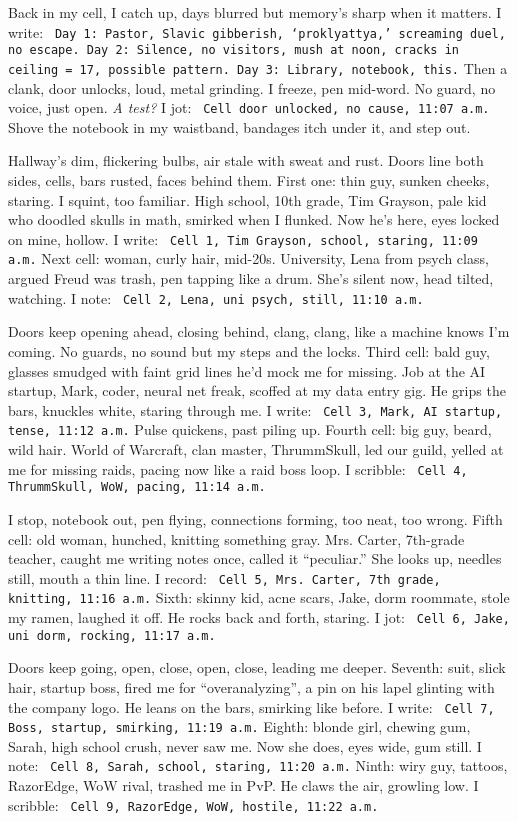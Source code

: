 \documentclass[12pt]{article} %
\newcommand{\note}[1]{\texttt{\small \color{DarkGray} #1}}
\begin{document}
Back in my cell, I catch up, days blurred but memory’s sharp when it matters. I write: \note{Day 1: Pastor, Slavic gibberish, ‘proklyattya,’ screaming duel, no escape. Day 2: Silence, no visitors, mush at noon, cracks in ceiling = 17, possible pattern. Day 3: Library, notebook, this.} Then a clank, door unlocks, loud, metal grinding. I freeze, pen mid-word. No guard, no voice, just open. \textit{A test?} I jot: \note{Cell door unlocked, no cause, 11:07 a.m.} Shove the notebook in my waistband, bandages itch under it, and step out.

Hallway’s dim, flickering bulbs, air stale with sweat and rust. Doors line both sides, cells, bars rusted, faces behind them. First one: thin guy, sunken cheeks, staring. I squint, too familiar. High school, 10th grade, \textnormal{Tim Grayson}, pale kid who doodled skulls in math, smirked when I flunked. Now he’s here, eyes locked on mine, hollow. I write: \note{Cell 1, Tim Grayson, school, staring, 11:09 a.m.} Next cell: woman, curly hair, mid-20s. University, \textnormal{Lena} from psych class, argued Freud was trash, pen tapping like a drum. She’s silent now, head tilted, watching. I note: \note{Cell 2, Lena, uni psych, still, 11:10 a.m.}

Doors keep opening ahead, closing behind, clang, clang, like a machine knows I’m coming. No guards, no sound but my steps and the locks. Third cell: bald guy, glasses smudged with faint grid lines he’d mock me for missing. Job at the AI startup, \textnormal{Mark}, coder, neural net freak, scoffed at my data entry gig. He grips the bars, knuckles white, staring through me. I write: \note{Cell 3, Mark, AI startup, tense, 11:12 a.m.} Pulse quickens, past piling up. Fourth cell: big guy, beard, wild hair. World of Warcraft, clan master, \textnormal{ThrummSkull}, led our guild, yelled at me for missing raids, pacing now like a raid boss loop. I scribble: \note{Cell 4, ThrummSkull, WoW, pacing, 11:14 a.m.}

I stop, notebook out, pen flying, connections forming, too neat, too wrong. Fifth cell: old woman, hunched, knitting something gray. \textnormal{Mrs. Carter}, 7th-grade teacher, caught me writing notes once, called it “peculiar.” She looks up, needles still, mouth a thin line. I record: \note{Cell 5, Mrs. Carter, 7th grade, knitting, 11:16 a.m.} Sixth: skinny kid, acne scars, \textnormal{Jake}, dorm roommate, stole my ramen, laughed it off. He rocks back and forth, staring. I jot: \note{Cell 6, Jake, uni dorm, rocking, 11:17 a.m.}

Doors keep going, open, close, open, close, leading me deeper. Seventh: suit, slick hair, startup boss, fired me for “overanalyzing”, a pin on his lapel glinting with the company logo. He leans on the bars, smirking like before. I write: \note{Cell 7, Boss, startup, smirking, 11:19 a.m.} Eighth: blonde girl, chewing gum, \textnormal{Sarah}, high school crush, never saw me. Now she does, eyes wide, gum still. I note: \note{Cell 8, Sarah, school, staring, 11:20 a.m.} Ninth: wiry guy, tattoos, \textnormal{RazorEdge}, WoW rival, trashed me in PvP. He claws the air, growling low. I scribble: \note{Cell 9, RazorEdge, WoW, hostile, 11:22 a.m.}
\end{document}
